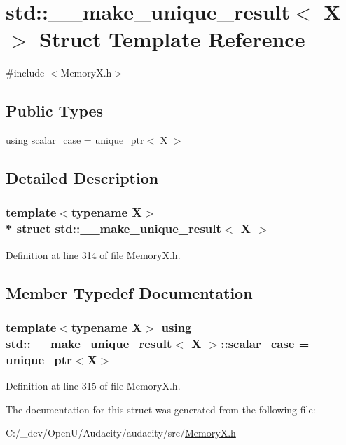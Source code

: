 \hypertarget{structstd_1_1____make__unique__result}{}\section{std\+:\+:\+\_\+\+\_\+make\+\_\+unique\+\_\+result$<$ X $>$ Struct Template Reference}
\label{structstd_1_1____make__unique__result}


{\ttfamily \#include $<$Memory\+X.\+h$>$}

\subsection*{Public Types}
\begin{DoxyCompactItemize}
\item 
using \hyperlink{structstd_1_1____make__unique__result_ac9e9dc8cb3ee6dbc18295ba81d1d5ca5}{scalar\+\_\+case} = unique\+\_\+ptr$<$ X $>$
\end{DoxyCompactItemize}


\subsection{Detailed Description}
\subsubsection*{template$<$typename X$>$\\*
struct std\+::\+\_\+\+\_\+make\+\_\+unique\+\_\+result$<$ X $>$}



Definition at line 314 of file Memory\+X.\+h.



\subsection{Member Typedef Documentation}
\subsubsection[{\texorpdfstring{scalar\+\_\+case}{scalar_case}}]{\setlength{\rightskip}{0pt plus 5cm}template$<$typename X$>$ using {\bf std\+::\+\_\+\+\_\+make\+\_\+unique\+\_\+result}$<$ X $>$\+::{\bf scalar\+\_\+case} =  unique\+\_\+ptr$<$X$>$}\hypertarget{structstd_1_1____make__unique__result_ac9e9dc8cb3ee6dbc18295ba81d1d5ca5}{}\label{structstd_1_1____make__unique__result_ac9e9dc8cb3ee6dbc18295ba81d1d5ca5}


Definition at line 315 of file Memory\+X.\+h.



The documentation for this struct was generated from the following file\+:\begin{DoxyCompactItemize}
\item 
C\+:/\+\_\+dev/\+Open\+U/\+Audacity/audacity/src/\hyperlink{_memory_x_8h}{Memory\+X.\+h}\end{DoxyCompactItemize}
